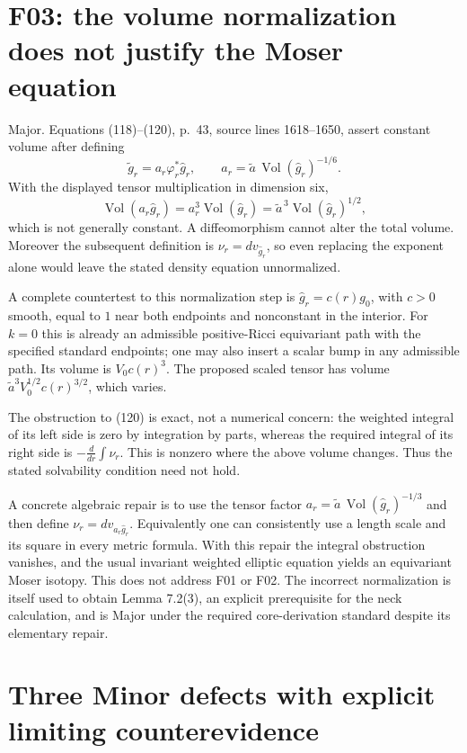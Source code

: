 \documentclass[10pt]{article}
\begin{document}
\section*{F03: the volume normalization does not justify the Moser equation}
Major. Equations (118)–(120), p. 43, source lines 1618–1650, assert constant volume after defining \[\widetilde g_r=a_r\varphi_r^*\widehat g_r,\qquad
 a_r=\widetilde a\,\operatorname{Vol}(\widehat g_r)^{-1/6}.\] With the displayed tensor multiplication in dimension six, \[\operatorname{Vol}(a_r\widehat g_r)
  =a_r^3\operatorname{Vol}(\widehat g_r)
  =\widetilde a^{\,3}\operatorname{Vol}(\widehat g_r)^{1/2},\] which is not generally constant. A diffeomorphism cannot alter the total volume. Moreover the subsequent definition is \(\nu_r=dv_{\widehat g_r}\), so even replacing the exponent alone would leave the stated density equation unnormalized.\par
A complete countertest to this normalization step is \(\widehat g_r=c(r)g_0\), with \(c>0\) smooth, equal to \(1\) near both endpoints and nonconstant in the interior. For \(k=0\) this is already an admissible positive-Ricci equivariant path with the specified standard endpoints; one may also insert a scalar bump in any admissible path. Its volume is \(V_0c(r)^3\). The proposed scaled tensor has volume \(\widetilde a^3V_0^{1/2}c(r)^{3/2}\), which varies.\par
The obstruction to (120) is exact, not a numerical concern: the weighted integral of its left side is zero by integration by parts, whereas the required integral of its right side is \(-\frac{d}{dr}\int\nu_r\). This is nonzero where the above volume changes. Thus the stated solvability condition need not hold.\par
A concrete algebraic repair is to use the tensor factor \(a_r=\widetilde a\,\operatorname{Vol}(\widehat g_r)^{-1/3}\) and then define \(\nu_r=dv_{a_r\widehat g_r}\). Equivalently one can consistently use a length scale and its square in every metric formula. With this repair the integral obstruction vanishes, and the usual invariant weighted elliptic equation yields an equivariant Moser isotopy. This does not address F01 or F02. The incorrect normalization is itself used to obtain Lemma 7.2(3), an explicit prerequisite for the neck calculation, and is Major under the required core-derivation standard despite its elementary repair.\par
\section*{Three Minor defects with explicit limiting counterevidence}
\end{document}
